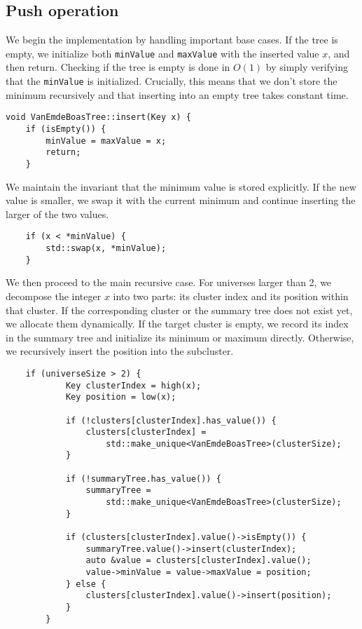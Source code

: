 \subsection{Push operation}

We begin the implementation by handling important base cases. If the tree is empty, we initialize both \texttt{minValue} and \texttt{maxValue} with the inserted value \( x \), and then return. Checking if the tree is empty is done in \(O(1)\) by simply verifying that the \texttt{minValue} is initialized. Crucially, this means that we don't store the minimum recursively and that inserting into an empty tree takes constant time.

\begin{verbatim}
void VanEmdeBoasTree::insert(Key x) {
    if (isEmpty()) {
        minValue = maxValue = x;
        return;
    }
\end{verbatim}

We maintain the invariant that the minimum value is stored explicitly. If the new value is smaller, we swap it with the current minimum and continue inserting the larger of the two values.

\begin{verbatim}
    if (x < *minValue) {
        std::swap(x, *minValue);
    }
\end{verbatim}

We then proceed to the main recursive case. For universes larger than 2, we decompose the integer \( x \) into two parts: its cluster index and its position within that cluster. If the corresponding cluster or the summary tree does not exist yet, we allocate them dynamically. If the target cluster is empty, we record its index in the summary tree and initialize its minimum or maximum directly. Otherwise, we recursively insert the position into the subcluster.

\begin{verbatim}
    if (universeSize > 2) {
            Key clusterIndex = high(x);
            Key position = low(x);

            if (!clusters[clusterIndex].has_value()) {
                clusters[clusterIndex] = 
                    std::make_unique<VanEmdeBoasTree>(clusterSize);
            }

            if (!summaryTree.has_value()) {
                summaryTree = 
                    std::make_unique<VanEmdeBoasTree>(clusterSize);
            }

            if (clusters[clusterIndex].value()->isEmpty()) {
                summaryTree.value()->insert(clusterIndex);
                auto &value = clusters[clusterIndex].value();
                value->minValue = value->maxValue = position;
            } else {
                clusters[clusterIndex].value()->insert(position);
            }
        }
\end{verbatim}

